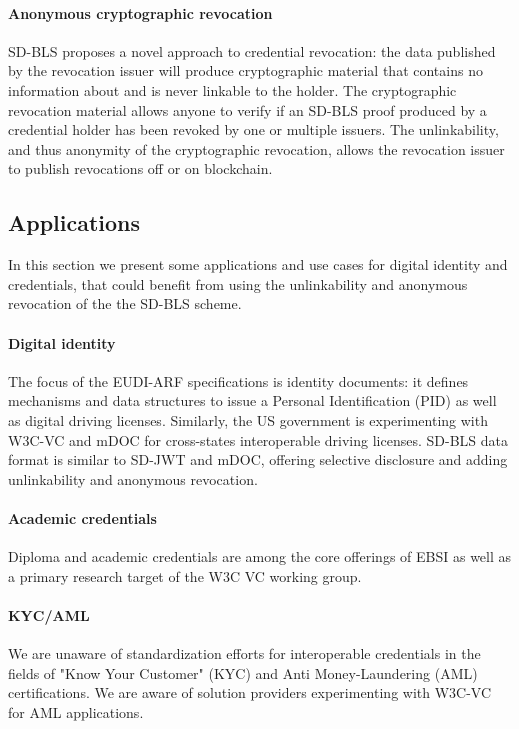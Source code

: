 \paragraph{Anonymous cryptographic revocation}
SD-BLS proposes a novel approach to credential revocation: the data published by the revocation issuer will produce cryptographic material that contains no information about and is  never linkable to the holder. The cryptographic revocation material allows anyone to verify if an SD-BLS proof produced by a credential holder has been revoked by one or multiple issuers. The unlinkability, and thus anonymity of the cryptographic revocation,  allows the revocation issuer to publish revocations off or on blockchain.

\subsection{Applications}
In this section we present some applications and use cases for digital identity and credentials, that could benefit from using the unlinkability and anonymous revocation of the the SD-BLS scheme.

\paragraph{Digital identity}
The focus of the EUDI-ARF specifications is identity documents: it defines mechanisms and data structures to issue a Personal Identification (PID) as well as digital driving licenses. Similarly, the US government is experimenting with W3C-VC and mDOC for cross-states interoperable driving licenses. SD-BLS data format is similar to SD-JWT and mDOC, offering selective disclosure and adding unlinkability and anonymous revocation.

\paragraph{Academic credentials}
Diploma and academic credentials are among the core offerings of EBSI as well as a primary research target of the W3C VC working group.

\paragraph{KYC/AML}
We are unaware of standardization efforts for interoperable credentials in the fields of "Know Your Customer" (KYC) and Anti Money-Laundering (AML) certifications. We are aware of solution providers experimenting with W3C-VC for AML applications.

